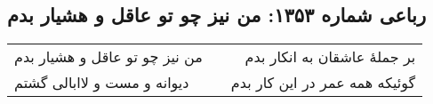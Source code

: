 \begin{center}
\section*{رباعی شماره ۱۳۵۳: من نیز چو تو عاقل و هشیار بدم}
\label{sec:1353}
\begin{longtable}{l p{0.5cm} r}
من نیز چو تو عاقل و هشیار بدم
&&
بر جملهٔ عاشقان به انکار بدم
\\
دیوانه و مست و لاابالی گشتم
&&
گوئیکه همه عمر در این کار بدم
\\
\end{longtable}
\end{center}
